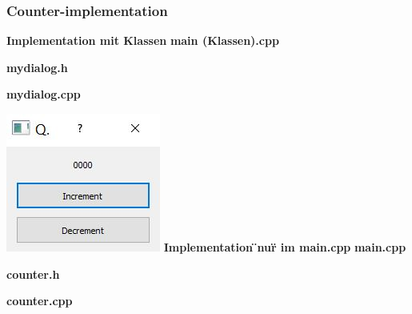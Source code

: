 \subsubsection{Counter-implementation}
\begin{multicols}{2}
    \begin{minipage}{\linewidth}
       \textbf{Implementation mit Klassen}\newline
       \textbf{main (Klassen).cpp}
       
       \textbf{mydialog.h}
       
       \textbf{mydialog.cpp}
       
    \end{minipage}

    \begin{minipage}{\linewidth}
        \includegraphics[width=0.5\linewidth]{images/count1}\newline
        \textbf{Implementation \"{}nur\"{} im main.cpp}
        \textbf{main.cpp}
        
    \end{minipage}
\end{multicols}
\clearpage
\textbf{counter.h}\newline

\textbf{counter.cpp}\newline


